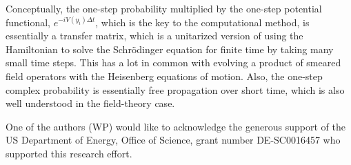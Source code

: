 \documentclass[aps,prc,reprint,noshowpacs,groupedaddress,onecolumn]{revtex4}
\begin{document}
Conceptually, the one-step probability multiplied by the one-step
potential functional, $e^{-i V(y_i)\Delta t}$, which is the key to the
computational method, is essentially a transfer matrix, which is a
unitarized version of using the Hamiltonian to solve the Schr\"odinger
equation for finite time by taking many small time steps.  This has a
lot in common with evolving a product of smeared field operators with
the Heisenberg equations of motion.  Also, the one-step complex
probability is essentially free propagation over short time, which is
also well understood in the field-theory case.

One of the authors (WP) would like to acknowledge the generous
support of the US Department of Energy, Office of Science, 
grant number DE-SC0016457 who supported this research effort.


\end{document}
